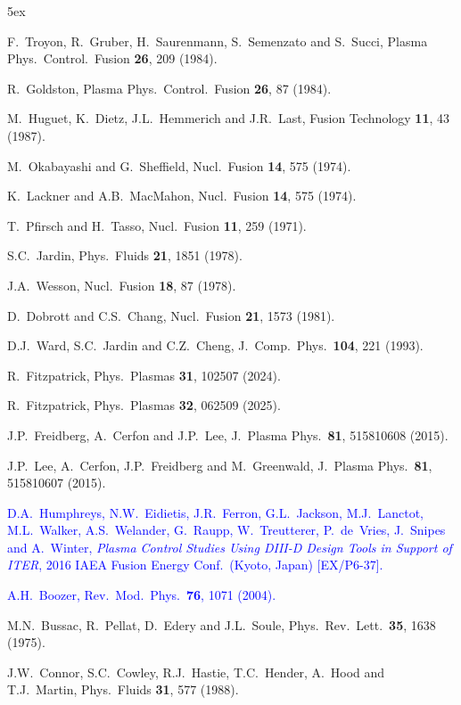 \documentclass[12pt,prb,aps]{revtex4-1}
\begin{document}
\begin{thebibliography}{99}\baselineskip 5ex

   F.~Troyon, R.~Gruber, H.~Saurenmann, S.~Semenzato and S.~Succi, Plasma Phys.\ Control.\ Fusion {\bf 26}, 209 (1984). 

 R.~Goldston, Plasma Phys.\ Control.\ Fusion {\bf 26}, 87 (1984).

 M.~Huguet, K.~Dietz,  J.L.~Hemmerich and J.R.~Last, Fusion Technology  {\bf 11}, 43 (1987).

 M.~Okabayashi and G.~Sheffield, Nucl.\ Fusion {\bf 14}, 575 (1974). 

 K.~Lackner and A.B.~MacMahon, Nucl.\ Fusion {\bf 14}, 575 (1974). 

 T.~Pfirsch and H.~Tasso, Nucl.\ Fusion {\bf 11}, 259 (1971).

 S.C.~Jardin, Phys.\ Fluids {\bf 21}, 1851 (1978). 

 J.A.~Wesson, Nucl.\ Fusion {\bf 18}, 87 (1978).

 D.~Dobrott and C.S.~Chang, Nucl.\ Fusion {\bf 21}, 1573 (1981).

 D.J.~Ward, S.C.~Jardin and C.Z.~Cheng, J.\ Comp.\ Phys.\ {\bf 104}, 221 (1993).

 R.~Fitzpatrick, Phys.\ Plasmas {\bf 31}, 102507 (2024).

 R.~Fitzpatrick, Phys.\ Plasmas {\bf 32}, 062509 (2025).

 J.P.~Freidberg, A.~Cerfon and J.P.~Lee, J.\ Plasma Phys.\ {\bf 81}, 515810608 (2015).

 J.P.~Lee, A.~Cerfon, J.P.~Freidberg and M.~Greenwald, J.\ Plasma Phys.\ {\bf 81}, 515810607 (2015).

\textcolor{blue}{ D.A.~Humphreys, N.W.~Eidietis, J.R.~Ferron, G.L.~Jackson, M.J.~Lanctot, M.L.~Walker, 
A.S.~Welander, G.~Raupp, W.~Treutterer, P.~de~Vries, J.~Snipes and A.~Winter, {\em Plasma Control Studies
Using DIII-D Design Tools in Support of ITER}, 2016 IAEA Fusion Energy Conf.\ (Kyoto, Japan) [EX/P6-37].}

\textcolor{blue}{ A.H.~Boozer, Rev.\ Mod.\ Phys.\ {\bf 76}, 1071 (2004). }

 M.N.~Bussac, R.~Pellat, D.~Edery and J.L.~Soule, Phys.\ Rev.\ Lett.\ {\bf 35}, 1638 (1975).

 J.W.~Connor,  S.C.~Cowley, R.J.~Hastie,  T.C.~Hender,  A.~Hood  and T.J.~Martin,  Phys.\ Fluids {\bf 31}, 577 (1988).


\end{thebibliography}
\end{document}
